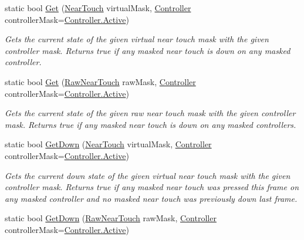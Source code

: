 \begin{DoxyCompactItemize}
static bool \mbox{\hyperlink{class_o_v_r_input_a89c93aac3fe4c225f2dd8984055cc163}{Get}} (\mbox{\hyperlink{class_o_v_r_input_afa31aa573064be9bab8fc9e58cddeab6}{Near\+Touch}} virtual\+Mask, \mbox{\hyperlink{class_o_v_r_input_a5c86f9052a9cbb0b73779ff5704d60a8}{Controller}} controller\+Mask=\mbox{\hyperlink{class_o_v_r_input_a5c86f9052a9cbb0b73779ff5704d60a8a4d3d769b812b6faa6b76e1a8abaece2d}{Controller.\+Active}})
\begin{DoxyCompactList}\small\item\em Gets the current state of the given virtual near touch mask with the given controller mask. Returns true if any masked near touch is down on any masked controller. \end{DoxyCompactList}\item 
static bool \mbox{\hyperlink{class_o_v_r_input_afa96809b0dd349bfa586e97932f4f129}{Get}} (\mbox{\hyperlink{class_o_v_r_input_ac9c3c10aa9911507c6dc66e2dd6ec60e}{Raw\+Near\+Touch}} raw\+Mask, \mbox{\hyperlink{class_o_v_r_input_a5c86f9052a9cbb0b73779ff5704d60a8}{Controller}} controller\+Mask=\mbox{\hyperlink{class_o_v_r_input_a5c86f9052a9cbb0b73779ff5704d60a8a4d3d769b812b6faa6b76e1a8abaece2d}{Controller.\+Active}})
\begin{DoxyCompactList}\small\item\em Gets the current state of the given raw near touch mask with the given controller mask. Returns true if any masked near touch is down on any masked controllers. \end{DoxyCompactList}\item 
static bool \mbox{\hyperlink{class_o_v_r_input_afb4731b4094d004c6df90d86189cb138}{Get\+Down}} (\mbox{\hyperlink{class_o_v_r_input_afa31aa573064be9bab8fc9e58cddeab6}{Near\+Touch}} virtual\+Mask, \mbox{\hyperlink{class_o_v_r_input_a5c86f9052a9cbb0b73779ff5704d60a8}{Controller}} controller\+Mask=\mbox{\hyperlink{class_o_v_r_input_a5c86f9052a9cbb0b73779ff5704d60a8a4d3d769b812b6faa6b76e1a8abaece2d}{Controller.\+Active}})
\begin{DoxyCompactList}\small\item\em Gets the current down state of the given virtual near touch mask with the given controller mask. Returns true if any masked near touch was pressed this frame on any masked controller and no masked near touch was previously down last frame. \end{DoxyCompactList}\item 
static bool \mbox{\hyperlink{class_o_v_r_input_adb67773105cb3dbda71635d14b0963d5}{Get\+Down}} (\mbox{\hyperlink{class_o_v_r_input_ac9c3c10aa9911507c6dc66e2dd6ec60e}{Raw\+Near\+Touch}} raw\+Mask, \mbox{\hyperlink{class_o_v_r_input_a5c86f9052a9cbb0b73779ff5704d60a8}{Controller}} controller\+Mask=\mbox{\hyperlink{class_o_v_r_input_a5c86f9052a9cbb0b73779ff5704d60a8a4d3d769b812b6faa6b76e1a8abaece2d}{Controller.\+Active}})

\end{DoxyCompactItemize}
